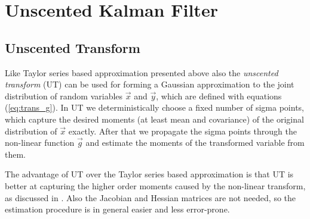 \section{Unscented Kalman Filter}
%

\subsection{Unscented Transform}

Like Taylor series based approximation presented above also the {\it
unscented transform} (UT) \citep{Julier+Uhlmann+Durrant-Whyte:1995, Julier+Uhlmann:2004, Wan+Merwe:2001} can be used for forming a Gaussian approximation to
the joint distribution of random variables $\vec{x}$ and $\vec{y}$,
which are defined with equations (\ref{eq:trans_g}). In UT we
deterministically choose a fixed number of sigma points, which capture
the desired moments (at least mean and covariance) of the original
distribution of $\vec{x}$ exactly. After that we propagate the sigma
points through the non-linear function $\vec{g}$ and estimate the
moments of the transformed variable from them.

The advantage of UT over the Taylor series based approximation is that
UT is better at capturing the higher order moments caused by the
non-linear transform, as discussed in \citep{Julier+Uhlmann:2004}. Also
the Jacobian and Hessian matrices are not needed, so the estimation
procedure is in general easier and less error-prone.
 
